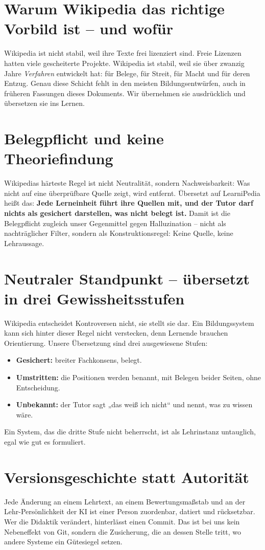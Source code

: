 \documentclass[11pt,a4paper]{article}
\begin{document}
\section{Warum Wikipedia das richtige Vorbild ist -- und wofür}
Wikipedia ist nicht stabil, weil ihre Texte frei lizenziert sind. Freie Lizenzen hatten viele gescheiterte Projekte. Wikipedia ist stabil, weil sie über zwanzig Jahre \textit{Verfahren} entwickelt hat: für Belege, für Streit, für Macht und für deren Entzug. Genau diese Schicht fehlt in den meisten Bildungsentwürfen, auch in früheren Fassungen dieses Dokuments. Wir übernehmen sie ausdrücklich und übersetzen sie ins Lernen.

\section{Belegpflicht und keine Theoriefindung}
Wikipedias härteste Regel ist nicht Neutralität, sondern Nachweisbarkeit: Was nicht auf eine überprüfbare Quelle zeigt, wird entfernt. Übersetzt auf LearniPedia heißt das: \textbf{Jede Lerneinheit führt ihre Quellen mit, und der Tutor darf nichts als gesichert darstellen, was nicht belegt ist.} Damit ist die Belegpflicht zugleich unser Gegenmittel gegen Halluzination -- nicht als nachträglicher Filter, sondern als Konstruktionsregel: Keine Quelle, keine Lehraussage.

\section{Neutraler Standpunkt -- übersetzt in drei Gewissheitsstufen}
Wikipedia entscheidet Kontroversen nicht, sie stellt sie dar. Ein Bildungssystem kann sich hinter dieser Regel nicht verstecken, denn Lernende brauchen Orientierung. Unsere Übersetzung sind drei ausgewiesene Stufen:
\begin{itemize}[label=--]
    \item \textbf{Gesichert:} breiter Fachkonsens, belegt.
    \item \textbf{Umstritten:} die Positionen werden benannt, mit Belegen beider Seiten, ohne Entscheidung.
    \item \textbf{Unbekannt:} der Tutor sagt „das weiß ich nicht“ und nennt, was zu wissen wäre.
\end{itemize}
\noindent Ein System, das die dritte Stufe nicht beherrscht, ist als Lehrinstanz untauglich, egal wie gut es formuliert.

\section{Versionsgeschichte statt Autorität}
Jede Änderung an einem Lehrtext, an einem Bewertungsmaßstab und an der Lehr-Persönlichkeit der KI ist einer Person zuordenbar, datiert und rücksetzbar. Wer die Didaktik verändert, hinterlässt einen Commit. Das ist bei uns kein Nebeneffekt von Git, sondern die Zusicherung, die an dessen Stelle tritt, wo andere Systeme ein Gütesiegel setzen.
\end{document}
